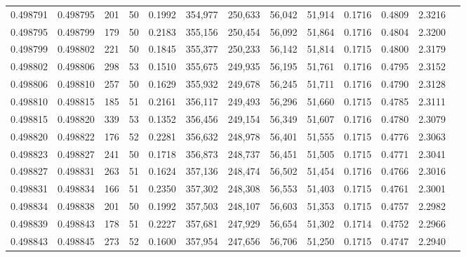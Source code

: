 \begin{tabular}{rrrrrrrrrrrrr}
0.498791 & 0.498795 & 201 &  50 &                                     0.1992 & 354,977 & 250,633 &  56,042 &  51,914 & 0.1716 & 0.4809 & 2.3216 \\
0.498795 & 0.498799 & 179 &  50 &                                     0.2183 & 355,156 & 250,454 &  56,092 &  51,864 & 0.1716 & 0.4804 & 2.3200 \\
0.498799 & 0.498802 & 221 &  50 &                                     0.1845 & 355,377 & 250,233 &  56,142 &  51,814 & 0.1715 & 0.4800 & 2.3179 \\
0.498802 & 0.498806 & 298 &  53 &                                     0.1510 & 355,675 & 249,935 &  56,195 &  51,761 & 0.1716 & 0.4795 & 2.3152 \\
0.498806 & 0.498810 & 257 &  50 &                                     0.1629 & 355,932 & 249,678 &  56,245 &  51,711 & 0.1716 & 0.4790 & 2.3128 \\
0.498810 & 0.498815 & 185 &  51 &                                     0.2161 & 356,117 & 249,493 &  56,296 &  51,660 & 0.1715 & 0.4785 & 2.3111 \\
0.498815 & 0.498820 & 339 &  53 &                                     0.1352 & 356,456 & 249,154 &  56,349 &  51,607 & 0.1716 & 0.4780 & 2.3079 \\
0.498820 & 0.498822 & 176 &  52 &                                     0.2281 & 356,632 & 248,978 &  56,401 &  51,555 & 0.1715 & 0.4776 & 2.3063 \\
0.498823 & 0.498827 & 241 &  50 &                                     0.1718 & 356,873 & 248,737 &  56,451 &  51,505 & 0.1715 & 0.4771 & 2.3041 \\
0.498827 & 0.498831 & 263 &  51 &                                     0.1624 & 357,136 & 248,474 &  56,502 &  51,454 & 0.1716 & 0.4766 & 2.3016 \\
0.498831 & 0.498834 & 166 &  51 &                                     0.2350 & 357,302 & 248,308 &  56,553 &  51,403 & 0.1715 & 0.4761 & 2.3001 \\
0.498834 & 0.498838 & 201 &  50 &                                     0.1992 & 357,503 & 248,107 &  56,603 &  51,353 & 0.1715 & 0.4757 & 2.2982 \\
0.498839 & 0.498843 & 178 &  51 &                                     0.2227 & 357,681 & 247,929 &  56,654 &  51,302 & 0.1714 & 0.4752 & 2.2966 \\
0.498843 & 0.498845 & 273 &  52 &                                     0.1600 & 357,954 & 247,656 &  56,706 &  51,250 & 0.1715 & 0.4747 & 2.2940 \\

\end{tabular}
